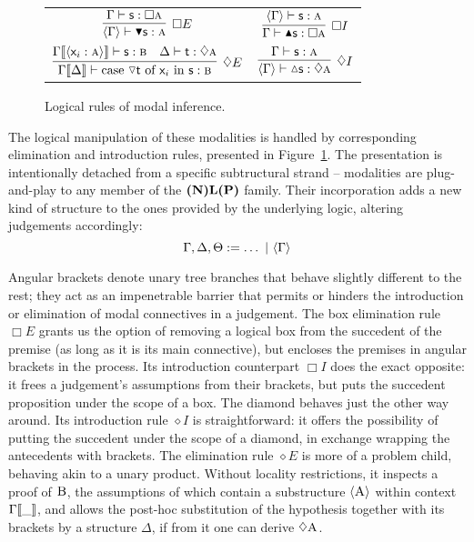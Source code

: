\begin{figure}
	\centering
	\begin{tabularx}{0.9875\textwidth}{@{}CC@{}}
		$\infer[\Box E]{\bracket{\Gamma} \vdash \boxelim{\term{s}}: \prop{a}}{
			\Gamma \vdash \term{s}: \Box\prop{a}
		}$
		&
		$\infer[\Box I]{\Gamma \vdash \boxintro{\term{s}}:\Box\prop{a}}{
			\bracket{\Gamma} \vdash \term{s}:\prop{a}
		}$
		\\[\smallsep]
		$\infer[\diamond E]{\Gamma\ctx{\Delta} \vdash \cterm{case \term{\diaelim t} of \term{\vari } in \term{s}}: \prop{b}}{
			\Gamma\ctx{\bracket{\term{\vari }:\prop{a}}}\vdash\term{s}:\prop{b}
			&
			\Delta \vdash \term{t}:\diamond\prop{a}
		}
		$
		&
		$\infer[\diamond I]{\bracket{\Gamma} \vdash \diaintro{\term{s}}: \diamond \prop{a}}{
			\Gamma \vdash \term{s}:\prop{a}
		}$
	\end{tabularx}
	\caption{Logical rules of modal inference.}
	\label{figure:modal_logical}
\end{figure}

The logical manipulation of these modalities is handled by corresponding elimination and introduction rules, presented in Figure~\ref{figure:modal_logical}.
The presentation is intentionally detached from a specific subtructural strand -- modalities are plug-and-play to any member of the $\textbf{(N)L(P)}$ family.
Their incorporation adds a new kind of structure to the ones provided by the underlying logic, altering judgements accordingly:
\begin{equation}
	\Gamma, \Delta, \Theta := \dots \ | \ \bracket{\Gamma}
\end{equation}

Angular brackets denote unary tree branches that behave slightly different to the rest; they act as an impenetrable barrier that permits or hinders the introduction or elimination of modal connectives in a judgement.
The box elimination rule $\Box E$ grants us the option of removing a logical box from the succedent of the premise (as long as it is its main connective), but encloses the premises in angular brackets in the process.
Its introduction counterpart $\Box I$ does the exact opposite: it frees a judgement's assumptions from their brackets, but puts the succedent proposition under the scope of a box.
The diamond behaves just the other way around.
Its introduction rule $\diamond I$ is straightforward: it offers the possibility of putting the succedent under the scope of a diamond, in exchange wrapping the antecedents with brackets.
The elimination rule $\diamond E$ is more of a problem child, behaving akin to a unary product.
Without locality restrictions, it inspects a proof of $\normalfont\textsc{B}$, the assumptions of which contain a substructure $\langle{ \ensuremath{\normalfont\textsc{A}}}\rangle$ within context $\Gamma{\llbracket{\_}\rrbracket}$, and allows the post-hoc substitution of the hypothesis together with its brackets by a structure $\Delta$, if from it one can derive $\diamond \smallprop{A}$.

